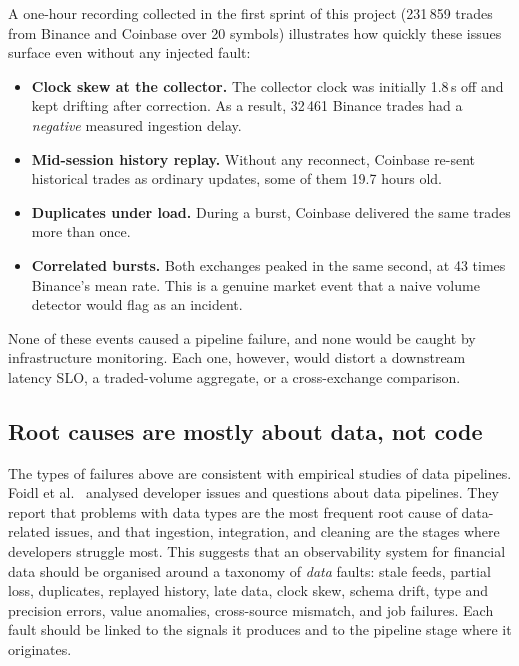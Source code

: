 A one-hour recording collected in the first sprint of this project
(231\,859 trades from Binance and Coinbase over 20 symbols) illustrates how quickly
these issues surface even without any injected fault:
\begin{itemize}
  \item \textbf{Clock skew at the collector.} The collector clock was initially
        1.8\,s off and kept drifting after correction. As a result,
        32\,461 Binance trades had a \emph{negative} measured ingestion delay.
  \item \textbf{Mid-session history replay.} Without any reconnect, Coinbase
        re-sent historical trades as ordinary updates, some of them 19.7 hours old.
  \item \textbf{Duplicates under load.} During a burst, Coinbase delivered the same
        trades more than once.
  \item \textbf{Correlated bursts.} Both exchanges peaked in the same second, at
        43 times Binance's mean rate. This is a genuine market event that a naive
        volume detector would flag as an incident.
\end{itemize}
None of these events caused a pipeline failure, and none would be caught by
infrastructure monitoring. Each one, however, would distort a downstream latency
SLO, a traded-volume aggregate, or a cross-exchange comparison.

\subsection{Root causes are mostly about data, not code}

The types of failures above are consistent with empirical studies of data
pipelines. Foidl et al.~\cite{foidl2023pipeline} analysed developer issues and
questions about data pipelines. They report that problems with data types are the
most frequent root cause of data-related issues, and that ingestion, integration,
and cleaning are the stages where developers struggle most.
This suggests that an observability system for financial data should be organised
around a taxonomy of \emph{data} faults: stale feeds, partial loss, duplicates,
replayed history, late data, clock skew, schema drift, type and precision errors,
value anomalies, cross-source mismatch, and job failures. Each fault should be
linked to the signals it produces and to the pipeline stage where it originates.

